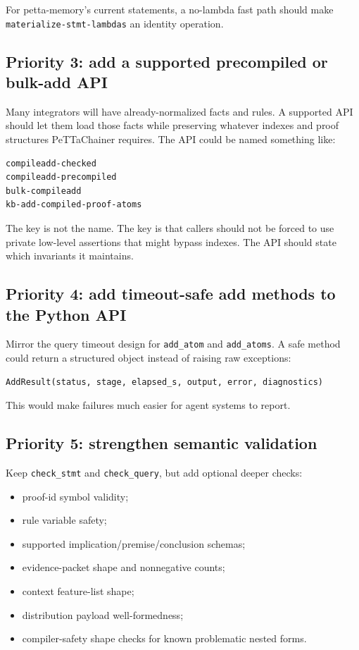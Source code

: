 \documentclass[11pt]{article}
\newcommand{\code}[1]{\texttt{#1}}
\begin{document}
For petta-memory's current statements, a no-lambda fast path should make
\code{materialize-stmt-lambdas} an identity operation.

\subsection{Priority 3: add a supported precompiled or bulk-add API}

Many integrators will have already-normalized facts and rules.  A supported API
should let them load those facts while preserving whatever indexes and proof
structures PeTTaChainer requires.  The API could be named something like:
\begin{verbatim}
compileadd-checked
compileadd-precompiled
bulk-compileadd
kb-add-compiled-proof-atoms
\end{verbatim}

The key is not the name.  The key is that callers should not be forced to use
private low-level assertions that might bypass indexes.  The API should state
which invariants it maintains.

\subsection{Priority 4: add timeout-safe add methods to the Python API}

Mirror the query timeout design for \code{add\_atom} and \code{add\_atoms}.  A
safe method could return a structured object instead of raising raw exceptions:
\begin{verbatim}
AddResult(status, stage, elapsed_s, output, error, diagnostics)
\end{verbatim}

This would make failures much easier for agent systems to report.

\subsection{Priority 5: strengthen semantic validation}

Keep \code{check\_stmt} and \code{check\_query}, but add optional deeper checks:
\begin{itemize}
  \item proof-id symbol validity;
  \item rule variable safety;
  \item supported implication/premise/conclusion schemas;
  \item evidence-packet shape and nonnegative counts;
  \item context feature-list shape;
  \item distribution payload well-formedness;
  \item compiler-safety shape checks for known problematic nested forms.
\end{itemize}
\end{document}
